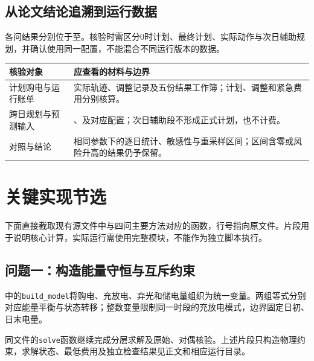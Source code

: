 \subsection{从论文结论追溯到运行数据}

各问结果分别位于至。核验时需区分0时计划、最终计划、实际动作与次日辅助规划，并确认使用同一配置，不能混合不同运行版本的数据。

\noindent\begin{tabularx}{\textwidth}{p{}L}
\toprule
核验对象 & 应查看的材料与边界 \\
\midrule
计划购电与运行账单 & 实际轨迹、调整记录及五份结果工作簿；计划、调整和紧急费用分别核算。 \\
跨日规划与预测输入 & 、及对应配置；次日辅助段不形成正式计划，也不计费。 \\
对照与结论 & 相同参数下的逐日统计、敏感性与重采样区间；区间含零或风险升高的结果仍予保留。 \\
\bottomrule
\end{tabularx}

\clearpage
\section{关键实现节选}
\label{app:code-excerpts}

下面直接截取现有源文件中与四问主要方法对应的函数，行号指向原文件。片段用于说明核心计算，实际运行需使用完整模块，不能作为独立脚本执行。

\begingroup
{}

\subsection{问题一：构造能量守恒与互斥约束}

中的\texttt{build\_model}将购电、充放电、弃光和储电量组织为统一变量。两组等式分别对应能量平衡与状态转移；整数变量限制同一时段的充放电模式，边界固定日初、日末电量。



同文件的\texttt{solve}函数继续完成分层求解及原始、对偶核验。上述片段只构造物理约束，求解状态、最低费用及独立检查结果见正文和相应运行目录。

